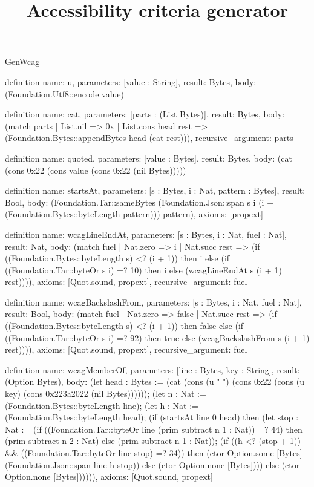 \begin{lexlean}{GenWcag}
\title{Accessibility criteria generator}
\begin{semanticmodule}
definition{
  name: u,
  parameters: [value : String],
  result: Bytes,
  body: (Foundation.Utf8::encode value)
}

definition{
  name: cat,
  parameters: [parts : (List Bytes)],
  result: Bytes,
  body: (match parts
    | List.nil => 0x
    | List.cons head rest => (Foundation.Bytes::appendBytes head (cat rest))),
  recursive_argument: parts
}

definition{
  name: quoted,
  parameters: [value : Bytes],
  result: Bytes,
  body: (cat (cons 0x22 (cons value (cons 0x22 (nil Bytes)))))
}

definition{
  name: startsAt,
  parameters: [s : Bytes, i : Nat, pattern : Bytes],
  result: Bool,
  body: (Foundation.Tar::sameBytes (Foundation.Json::span s i (i + (Foundation.Bytes::byteLength pattern))) pattern),
  axioms: [propext]
}

definition{
  name: wcagLineEndAt,
  parameters: [s : Bytes, i : Nat, fuel : Nat],
  result: Nat,
  body: (match fuel
    | Nat.zero => i
    | Nat.succ rest => (if ((Foundation.Bytes::byteLength s) <? (i + 1)) then i else (if ((Foundation.Tar::byteOr s i) =? 10) then i else (wcagLineEndAt s (i + 1) rest)))),
  axioms: [Quot.sound, propext],
  recursive_argument: fuel
}

definition{
  name: wcagBackslashFrom,
  parameters: [s : Bytes, i : Nat, fuel : Nat],
  result: Bool,
  body: (match fuel
    | Nat.zero => false
    | Nat.succ rest => (if ((Foundation.Bytes::byteLength s) <? (i + 1)) then false else (if ((Foundation.Tar::byteOr s i) =? 92) then true else (wcagBackslashFrom s (i + 1) rest)))),
  axioms: [Quot.sound, propext],
  recursive_argument: fuel
}

definition{
  name: wcagMemberOf,
  parameters: [line : Bytes, key : String],
  result: (Option Bytes),
  body: (let head : Bytes := (cat (cons (u "              ") (cons 0x22 (cons (u key) (cons 0x223a2022 (nil Bytes)))))); (let n : Nat := (Foundation.Bytes::byteLength line); (let h : Nat := (Foundation.Bytes::byteLength head); (if (startsAt line 0 head) then (let stop : Nat := (if ((Foundation.Tar::byteOr line (prim subtract n 1 : Nat)) =? 44) then (prim subtract n 2 : Nat) else (prim subtract n 1 : Nat)); (if ((h <? (stop + 1)) && ((Foundation.Tar::byteOr line stop) =? 34)) then (ctor Option.some [Bytes] (Foundation.Json::span line h stop)) else (ctor Option.none [Bytes]))) else (ctor Option.none [Bytes]))))),
  axioms: [Quot.sound, propext]
}


\end{semanticmodule}
\end{lexlean}
